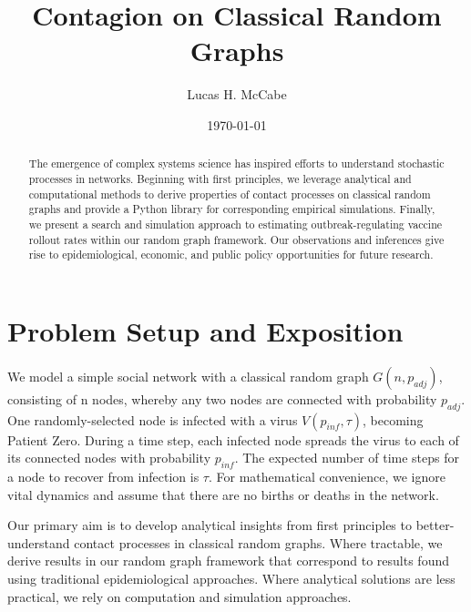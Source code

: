\documentclass[psamsfonts]{amsart}
\theoremstyle{definition}
\theoremstyle{remark}
\numberwithin{equation}{section}
\begin{document}
\title{Contagion on Classical Random Graphs}

\author{Lucas H. McCabe}

\address{Whiting School of Engineering, Johns Hopkins University}


\date{\today}

\begin{abstract}

The emergence of complex systems science has inspired efforts to understand stochastic processes in networks. Beginning with first principles, we leverage analytical and computational methods to derive properties of contact processes on classical random graphs and provide a Python library for corresponding empirical simulations. Finally, we present a search and simulation approach to estimating outbreak-regulating vaccine rollout rates within our random graph framework. Our observations and inferences give rise to epidemiological, economic, and public policy opportunities for future research.
\end{abstract}

\maketitle

\tableofcontents

\section{Problem Setup and Exposition}

We model a simple social network with a classical random graph $G(n, p_{adj})$, consisting of n nodes, whereby any two nodes are connected with probability $p_{adj}$. One randomly-selected node is infected with a virus $V(p_{inf}, \tau)$, becoming Patient Zero. During a time step, each infected node spreads the virus to each of its connected nodes with probability $p_{inf}$.  The expected number of time steps for a node to recover from infection is $\tau$. For mathematical convenience, we ignore vital dynamics and assume that there are no births or deaths in the network.

Our primary aim is to develop analytical insights from first principles to better-understand contact processes in classical random graphs. Where tractable, we derive results in our random graph framework that correspond to results found using traditional epidemiological approaches. Where analytical solutions are less practical, we rely on computation and simulation approaches.
\end{document}
